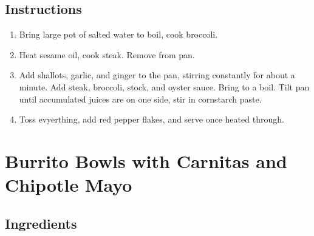 \documentclass[letterpaper,10pt,english]{sphinxmanual}
\begin{document}
\section{Instructions}
\label{\detokenize{Beef_Broc:instructions}}\begin{enumerate}
\item {} 
Bring large pot of salted water to boil, cook broccoli.

\item {} 
Heat sesame oil, cook steak. Remove from pan.

\item {} 
Add shallots, garlic, and ginger to the pan, stirring constantly for about a minute. Add steak, broccoli, stock, and oyster sauce. Bring to a boil. Tilt pan until accumulated juices are on one side, stir in cornstarch paste.

\item {} 
Toss evyerthing, add red pepper flakes, and serve once heated through.

\end{enumerate}


\chapter{Burrito Bowls with Carnitas and Chipotle Mayo}
\label{\detokenize{Burrito_Bowl:burrito-bowls-with-carnitas-and-chipotle-mayo}}\label{\detokenize{Burrito_Bowl::doc}}

\section{Ingredients}
\label{\detokenize{Burrito_Bowl:ingredients}}

%
\begin{sphinxVerbatim}[commandchars=\\\{\}]
           

   

         

     

   

     
\end{sphinxVerbatim}
\end{document}
